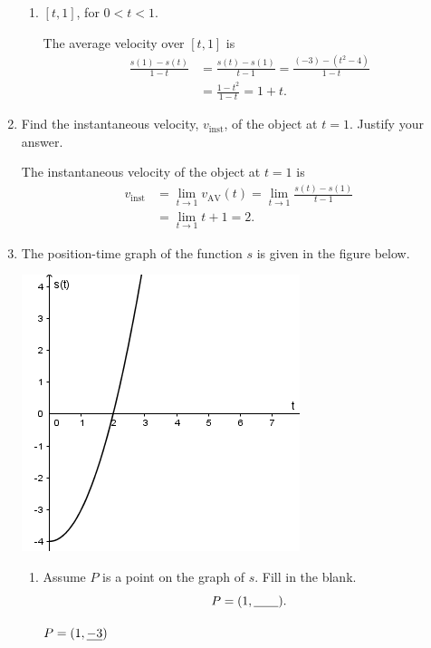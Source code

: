 \documentclass[nooutcomes]{ximera}
\begin{document}
\begin{problem}
\begin{enumerate}
\begin{enumerate}
\item
$[t, 1]$, for $0 < t < 1$.
\begin{freeResponse}
The average velocity over $[t, 1]$ is
\begin{align*}
\frac{s(1) - s(t)}{1-t} &= \frac{s(t) - s(1)}{t-1}=\frac{(-3) - (t^2-4)}{1-t}\\
&= \frac{1-t^2}{1-t} = 1+t.
\end{align*}
\end{freeResponse}
\end{enumerate}

\item 
Find the instantaneous velocity, $v_{\mathrm{inst}}$, of the object at $t = 1$.
Justify your answer.
\begin{freeResponse}
The instantaneous velocity of the object at $t = 1$ is
\begin{align*}
v_{\mathrm{inst}} &=\lim_{t \to 1}v_{\mathrm{AV}}(t)= \lim_{t \to 1} \frac{s(t) - s(1)}{t-1} \\
&= \lim_{t \to 1} t+1 = 2.
\end{align*}
\end{freeResponse}


\item
The position-time graph of the function $s$ is given in the figure below.
\begin{image}
\includegraphics[scale = .7]{Figure10.png}
\end{image}
\begin{enumerate}
\item
Assume $P$ is a point on the graph of $s$.
Fill in the blank.
\[
P = (1, \mbox{\underline{\hspace{2em}}}).
\]
\begin{freeResponse}
$P = (1, \mbox{\underline{$-3$}})$
\end{freeResponse}



\end{enumerate}
\end{enumerate}
\end{problem}
\end{document}
